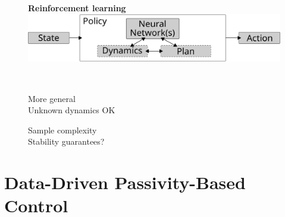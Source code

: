 \documentclass[
]{report}
\providecommand{\tightlist}{%
  \setlength{\itemsep}{0pt}\setlength{\parskip}{0pt}}\usepackage{longtable,booktabs,array}
\begin{document}
\begin{figure}

\begin{minipage}[c]{0.61\linewidth}

{\centering 

\textbf{Reinforcement learning}
\includegraphics{contents/assets/rl-outline.svg}

}

\end{minipage}%
%
\begin{minipage}[c]{0.03\linewidth}

{\centering 

~

}

\end{minipage}%
%
\begin{minipage}[c]{0.36\linewidth}

{\centering 

\begin{description}
\tightlist
\item[Strengths]
More general\\
Unknown dynamics OK
\item[Weaknesses]
Sample complexity\\
Stability guarantees?
\end{description}

}

\end{minipage}%

\end{figure}

\hypertarget{data-driven-passivity-based-control}{%
\section{Data-Driven Passivity-Based
Control}\label{data-driven-passivity-based-control}}
\end{document}
